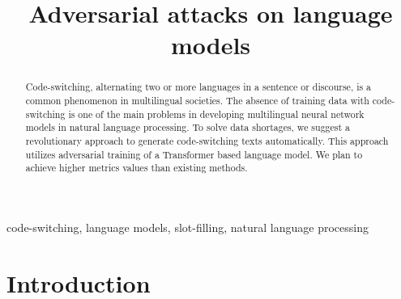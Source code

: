 \documentclass[conference]{IEEEtran}
\begin{document}
\title{Adversarial attacks on language models}

\author{
}

\maketitle

\begin{abstract}
Code-switching, alternating two or more languages in a sentence or discourse, is a common phenomenon in multilingual societies. The absence of training data with code-switching is one of the main problems in developing multilingual neural network models in natural language processing. To solve data shortages, we suggest a revolutionary approach to generate code-switching texts automatically. This approach utilizes adversarial training of a Transformer based language model. We plan to achieve higher metrics values than existing methods.
\end{abstract}

\begin{IEEEkeywords}
code-switching, language models, slot-filling, natural language processing
\end{IEEEkeywords}

\section{Introduction}
\end{document}

